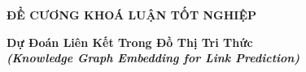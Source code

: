 \documentclass{article}[14pt]
\begin{document}
    \begin{figure}[h]
        \begin{floatrow}
        {%
    
        }
        {%
    
        }
        \end{floatrow}
    \end{figure}
    
    \begin{center}
        
        \textbf{\Large ĐỀ CƯƠNG KHOÁ LUẬN TỐT NGHIỆP} \\ 
    \end{center}
    
    
    \begin{center}
        
        \textbf{\huge Dự Đoán Liên Kết Trong Đồ Thị Tri Thức} 
        \\
        
    \vspace{.5cm}
        \textit{\textbf{\Large (Knowledge Graph Embedding for Link Prediction)}}
    \end{center}
    
    \vspace{.5cm}
    
    \Large
\end{document}
